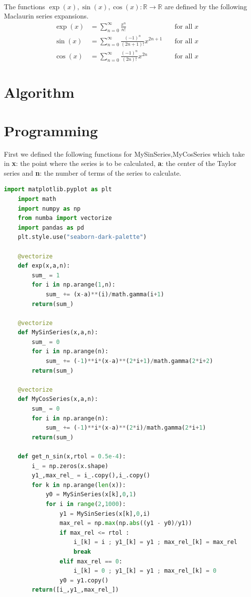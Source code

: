 \documentclass[12pt]{article}
\begin{document}
\noindent \\
The functions $ \exp(x),\sin(x),\cos(x): \mathbb{R} \rightarrow \mathbb{R}$ are defined by the following Maclaurin series expansions.
\begin{align}
	\exp(x) &=\sum _{n=0}^{\infty }{\frac {x^n}{n!}} &\quad {\text{for all }}x\\
	\sin(x) &=\sum _{n=0}^{\infty }{\frac {(-1)^{n}}{(2n+1)!}}x^{2n+1} &\quad {\text{for all }}x\\
	\cos(x) &=\sum _{n=0}^{\infty }{\frac {(-1)^{n}}{(2n)!}}x^{2n} &\quad {\text{for all }}x
\end{align}

\section{Algorithm}
\newpage
\section{Programming}
First we defined the following functions for MySinSeries,MyCosSeries which take in \textbf{x}: the point where the series is to be calculated, \textbf{a}: the center of the Taylor series and \textbf{n}: the number of terms of the series to calculate.
\begin{lstlisting}[language=Python]
	import matplotlib.pyplot as plt
	import math
	import numpy as np
	from numba import vectorize
	import pandas as pd
	plt.style.use("seaborn-dark-palette")
	
	@vectorize
	def exp(x,a,n):
		sum_ = 1
		for i in np.arange(1,n):
			sum_ += (x-a)**(i)/math.gamma(i+1)
		return(sum_)

	@vectorize
	def MySinSeries(x,a,n):
		sum_ = 0
		for i in np.arange(n):
			sum_ += (-1)**i*(x-a)**(2*i+1)/math.gamma(2*i+2)
		return(sum_)

	@vectorize
	def MyCosSeries(x,a,n):
		sum_ = 0
		for i in np.arange(n):
			sum_ += (-1)**i*(x-a)**(2*i)/math.gamma(2*i+1)
		return(sum_)

	def get_n_sin(x,rtol = 0.5e-4):
		i_ = np.zeros(x.shape)
		y1_,max_rel_ = i_.copy(),i_.copy()
		for k in np.arange(len(x)):        
			y0 = MySinSeries(x[k],0,1)
			for i in range(2,1000):
				y1 = MySinSeries(x[k],0,i)
				max_rel = np.max(np.abs((y1 - y0)/y1))
				if max_rel <= rtol :
					i_[k] = i ; y1_[k] = y1 ; max_rel_[k] = max_rel
					break
				elif max_rel == 0:
					i_[k] = 0 ; y1_[k] = y1 ; max_rel_[k] = 0
				y0 = y1.copy()
		return([i_,y1_,max_rel_])
\end{lstlisting}
\end{document}
